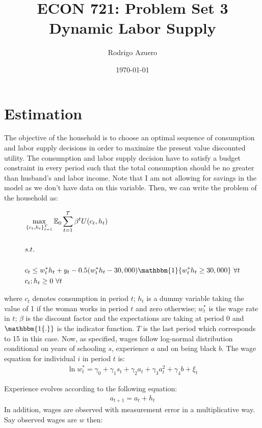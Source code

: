 \documentclass[11pt]{article}
\title{\vspace{-3cm}ECON 721: Problem Set 3\\Dynamic Labor Supply}
\author{Rodrigo Azuero}
\date{\today}
\begin{document}
\maketitle

\section{Estimation}

The objective of the household is to choose an optimal sequence of consumption and labor supply decisions in order to maximize the present value discounted utility. The consumption and labor supply decision have to satisfy a budget constraint in every period such that the total consumption should be no greater than husband's and labor income. Note that I am not allowing for savings in the model as we don't have data on this variable. Then, we can write the problem of the household as:

\begin{align}\label{eq:problem}
	& \max_{\{c_t,h_t\}_{t=1}^T}\mathbb{E}_0\sum_{t=1}^T \beta^tU(c_t,h_t) \nonumber \\[0.2in]
	& s.t. \nonumber \\[0.2in]
	& c_t \leq w^*_t h_t + y_t-0.5(w^*_th_t-30,000)\mathbbm{1}\{w^*_th_t\geq 30,000 \}  \nonumber\, \,  \forall t \\
	& c_t; h_t \geq0 \, \, \forall t
\end{align}

where $c_t$ denotes consumption in period $t$; $h_t$ is a dummy variable taking the value of 1 if the woman works in period $t$ and zero otherwise; $w^*_t$ is the wage rate in $t$; $\beta$ is the discount factor and the expectations are taking at period 0 and $\mathbbm{1\{ .\}}$ is the indicator function. $T$ is the last period which corresponds to 15 in this case. Now, as specified, wages follow log-normal distribution conditional on years of schooling $s$, experience $a$ and on being black $b$. The wage equation for individual $i$ in period $t$ is:
\begin{align}\label{eq:wages}
	\ln w^*_{t}=\gamma_0+\gamma_1s_{t}+\gamma_2a_{t}+\gamma_3a_{t}^2+\gamma_4b+\xi_t
\end{align}

Experience evolves according to the following equation:
\begin{align}
	a_{t+1}=a_{t}+h_t
\end{align}
 In addition, wages are observed with measurement error in a multiplicative way. Say observed wages are $w$ then:
\end{document}

